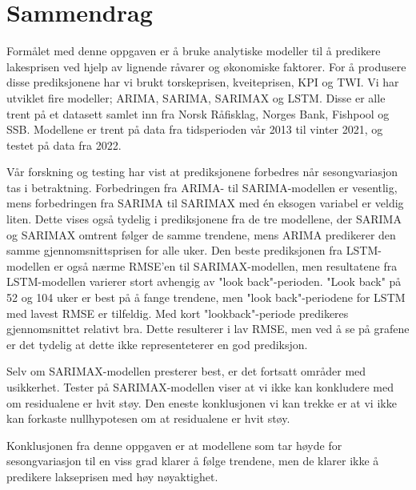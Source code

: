 \section*{Sammendrag}
Formålet med denne oppgaven er å bruke analytiske modeller til å predikere lakesprisen ved hjelp av lignende råvarer og økonomiske faktorer. For å produsere disse prediksjonene har vi brukt torskeprisen, kveiteprisen, KPI og TWI. Vi har utviklet fire modeller; ARIMA, SARIMA, SARIMAX og LSTM. Disse er alle trent på et datasett samlet inn fra Norsk Råfisklag, Norges Bank, Fishpool og SSB. Modellene er trent på data fra tidsperioden vår 2013 til vinter 2021, og testet på data fra 2022.

Vår forskning og testing har vist at prediksjonene forbedres når sesongvariasjon tas i betraktning. Forbedringen fra ARIMA- til SARIMA-modellen er vesentlig, mens forbedringen fra SARIMA til SARIMAX med én eksogen variabel er veldig liten. Dette vises også tydelig i prediksjonene fra de tre modellene, der SARIMA og SARIMAX omtrent følger de samme trendene, mens ARIMA predikerer den samme gjennomsnittsprisen for alle uker. Den beste prediksjonen fra LSTM-modellen er også nærme RMSE'en til SARIMAX-modellen, men resultatene fra LSTM-modellen varierer stort avhengig av "look back"-perioden. "Look back" på 52 og 104 uker er best på å fange trendene, men "look back"-periodene for LSTM med lavest RMSE er tilfeldig. Med kort "lookback"-periode predikeres gjennomsnittet relativt bra. Dette resulterer i lav RMSE, men ved å se på grafene er det tydelig at dette ikke representeterer en god prediksjon. 

Selv om SARIMAX-modellen presterer best, er det fortsatt områder med usikkerhet. Tester på SARIMAX-modellen viser at vi ikke kan konkludere med om residualene er hvit støy. Den eneste konklusjonen vi kan trekke er at vi ikke kan forkaste nullhypotesen om at residualene er hvit støy.

Konklusjonen fra denne oppgaven er at modellene som tar høyde for sesongvariasjon til en viss grad klarer å følge trendene, men de klarer ikke å predikere lakseprisen med høy nøyaktighet. 

